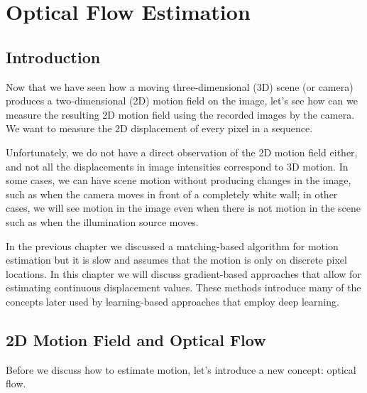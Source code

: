 

\chapter{Optical Flow Estimation}
\label{chap:optical_flow_estimation}


\section{Introduction}

Now that we have seen how a moving three-dimensional (3D) scene (or camera) produces a two-dimensional (2D) motion field on the image, let's see how can we measure the resulting 2D motion field using the recorded images by the camera. We want to measure the 2D displacement of every pixel in a sequence.


Unfortunately, we do not have a direct observation of the 2D motion field either, and not all the displacements in image intensities correspond to 3D motion. In some cases, we can have scene motion without producing changes in the image, such as when the camera moves in front of a completely white wall; in other cases, we will see motion in the image even when there is not motion in the scene such as when the illumination source moves.

In the previous chapter we discussed a matching-based algorithm for motion estimation but it is slow and assumes that the motion is only on discrete pixel locations. In this chapter we will discuss gradient-based approaches that allow for estimating continuous displacement values. These methods introduce many of the concepts later used by learning-based approaches that employ deep learning. 


\section{2D Motion Field and Optical Flow}

Before we discuss how to estimate motion, let's introduce a new concept: optical flow. 
 
